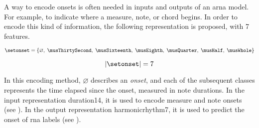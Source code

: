 
A way to encode onsets is often needed in inputs and outputs
of an \gls{arna} model. For example, to indicate where a
measure, note, or chord begins. 
In order to encode this kind of information, the following
representation is proposed, with 7 features.

\begin{equation}
    \label{eq:onset_7}
    \setonset = \{\varnothing,\; \musThirtySecond,\; \musSixteenth,\; 
    \musEighth,\; \musQuarter,\; \musHalf,\; \musWhole \}
\end{equation}

\begin{equation}
    \label{eq:onset_7_magnitude}
    | \setonset | = 7
\end{equation}

In this encoding method, $\varnothing$ describes an
\emph{onset}, and each of the subsequent classes represents
the time elapsed since the onset, measured in note
durations. In the input representation \gls{duration14}, it
is used to encode measure and note onsets (see
). In the output
representation \gls{harmonicrhythm7}, it is used to predict
the onset of \gls{rna} labels (see
).
